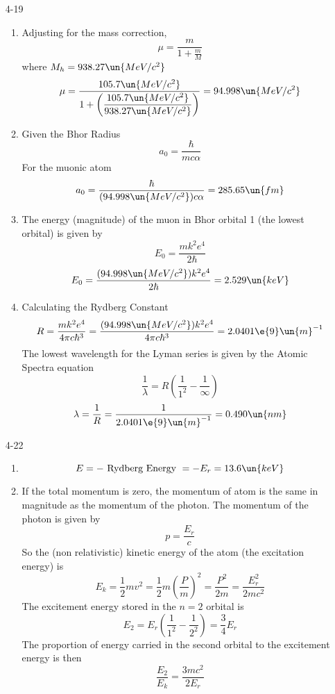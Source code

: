 \documentclass[]{2620hw}
\date{February 21st, 2014}
\begin{document}
\maketitle

\begin{enumerate}

\item [4-19]
\begin{enumerate}
	\item Adjusting for the mass correction,
	\[
		\mu = \frac{m}{1+ \frac{m}{M}}
	\]
	where $M_h = 938.27 \un{MeV/c^2} $
	\[
		\mu = \frac{105.7\un{MeV/c^2}}{1 + \left( \dfrac{105.7\un{MeV/c^2}}{938.27\un{MeV/c^2}} \right) } = 94.998\un{MeV/c^2} 
	\]
    \item Given the Bhor Radius
	\[
		a_0 = \frac{\hbar}{mc\alpha}	
	\]
	For the muonic atom
	\[ 
		a_0	= \frac{\hbar}{(94.998\un{MeV/c^2})c \alpha} = 285.65\un{fm}
	\]

	\item The energy (magnitude) of the muon in Bhor orbital 1 (the lowest orbital) is given by 
	\[
		E_0 = \frac{mk^2e^4}{2\hbar}	
	\]
	\[
		E_0 = \frac{(94.998\un{MeV/c^2})k^2e^4}{2 \hbar} = 2.529\un{keV} 
	\]
	\item Calculating the Rydberg Constant 
	\[
		R = \frac{mk^2e^4}{4 \pi c \hbar^3} = \frac{(94.998\un{MeV/c^2})k^2e^4}{4 \pi c \hbar^3} = 2.0401 \e{9}\un{m}^{-1}
	\]
	The lowest wavelength for the Lyman series is given by the Atomic Spectra equation
	\[
		\frac{1}{\lambda} = R \left( \frac{1}{1^2} - \frac{1}{\infty} \right)
	\]
	\[
		\lambda = \frac{1}{R} = \frac{1}{2.0401\e{9}\un{m}^{-1}} = 0.490 \un{nm}
	\]

\end{enumerate} 

\item [4-22]
\begin{enumerate}
    \item 
	\[
		E = - \text{ Rydberg Energy } = -E_r  = 13.6 \un{keV} 
	\]
	\item If the total momentum is zero, the momentum of atom is the same in magnitude as the momentum of the photon. The momentum of the photon is given by
	\[
		p = \frac{E_r}{c}
	\]
	So the (non relativistic) kinetic energy of the atom (the excitation energy) is
	\[
		E_k =  \frac{1}{2}mv^2 = \frac{1}{2}{m}\left( \frac{P}{m} \right)^2 = \frac{P^2}{2m} = \frac{E_r^2}{2mc^2} 
	\]
	The excitement energy stored in the $n=2$ orbital is 
	\[
		E_2 = E_r \left( \frac{1}{1^2} - \frac{1}{2^2} \right) = \frac{3}{4}E_r
	\]
	The proportion of energy carried in the second orbital to the excitement energy is then 
	\[
		\frac{E_2}{E_k} = \frac{3mc^2}{2E_r}
	\]
\end{enumerate}


\end{enumerate}
\end{document}

